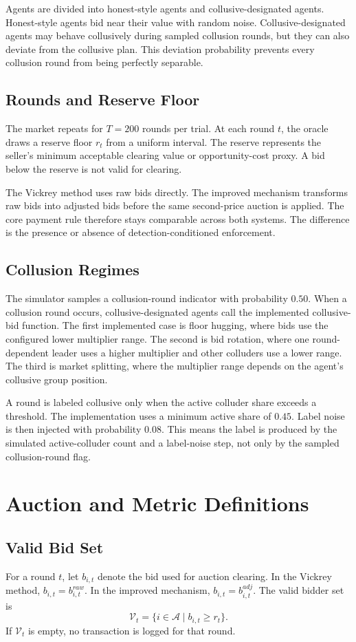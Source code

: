 \documentclass[conference]{IEEEtran}
\begin{document}
Agents are divided into honest-style agents and collusive-designated agents. Honest-style agents bid near their value with random noise. Collusive-designated agents may behave collusively during sampled collusion rounds, but they can also deviate from the collusive plan. This deviation probability prevents every collusion round from being perfectly separable.

\subsection{Rounds and Reserve Floor}
The market repeats for $T=200$ rounds per trial. At each round $t$, the oracle draws a reserve floor $r_t$ from a uniform interval. The reserve represents the seller's minimum acceptable clearing value or opportunity-cost proxy. A bid below the reserve is not valid for clearing.

The Vickrey method uses raw bids directly. The improved mechanism transforms raw bids into adjusted bids before the same second-price auction is applied. The core payment rule therefore stays comparable across both systems. The difference is the presence or absence of detection-conditioned enforcement.

\subsection{Collusion Regimes}
The simulator samples a collusion-round indicator with probability $0.50$. When a collusion round occurs, collusive-designated agents call the implemented collusive-bid function. The first implemented case is floor hugging, where bids use the configured lower multiplier range. The second is bid rotation, where one round-dependent leader uses a higher multiplier and other colluders use a lower range. The third is market splitting, where the multiplier range depends on the agent's collusive group position.

A round is labeled collusive only when the active colluder share exceeds a threshold. The implementation uses a minimum active share of $0.45$. Label noise is then injected with probability $0.08$. This means the label is produced by the simulated active-colluder count and a label-noise step, not only by the sampled collusion-round flag.

\section{Auction and Metric Definitions}
\subsection{Valid Bid Set}
For a round $t$, let $b_{i,t}$ denote the bid used for auction clearing. In the Vickrey method, $b_{i,t}=b^{raw}_{i,t}$. In the improved mechanism, $b_{i,t}=b^{adj}_{i,t}$. The valid bidder set is
\begin{equation}
\mathcal{V}_t = \{ i \in \mathcal{A} \mid b_{i,t} \geq r_t \}.
\end{equation}
If $\mathcal{V}_t$ is empty, no transaction is logged for that round.
\end{document}
